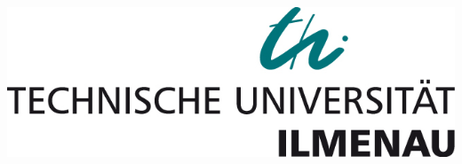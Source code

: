 \begin{titlepage}

\includegraphics{logo-tu-ilmenau}\\[1cm] %
 

\vfill %

\end{titlepage}

\thispagestyle{empty}
\newpage